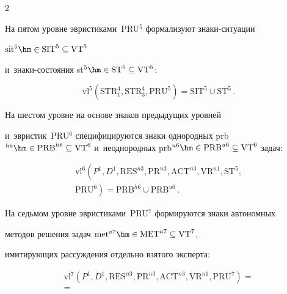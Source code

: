 \begin{multicols}{2}
  


  На пятом уровне эвристиками~PRU$^5$ формализуют зна\-ки-си\-ту\-ации 


$\mathrm{sit}^5\hm\in \mathrm{SIT}^5\subseteq \mathrm{VT}^5$ 


и~зна\-ки-со\-сто\-яния st$^5\hm\in 


\mathrm{ST}^5\subseteq \mathrm{VT}^5$:


    $$


\mathrm{vl}^5\!\left( \mathrm{STR}_1^4, \mathrm{STR}_3^4, \mathrm{PRU}^5\right) =


\mathrm{SIT}^5\cup \mathrm{ST}^5\,.


   $$


  


  На шестом уровне на основе знаков предыдущих уровней 


и~эвристик~PRU$^6$ специфицируются знаки однородных prb$^{h6} \hm\in 


\mathrm{PRB}^{h6}\subseteq \mathrm{VT}^6$ и~неоднородных prb$^{u6}\hm\in \mathrm{PRB}^{u6}\subseteq 


\mathrm{VT}^6$ задач:


   \begin{multline*}


\mathrm{vl}^6\!\left( P^1, D^1, \mathrm{RES}^{n3}, \mathrm{PR}^{n3}, 


\mathrm{ACT}^{n3}, \mathrm{VR}^{n1}, \mathrm{ST}^5,\right.\\ 


\left.\mathrm{PRU}^6\right) = \mathrm{PRB}^{h6}\cup \mathrm{PRB}^{u6}\,.


  \end{multline*}


  


  На седьмом уровне эвристиками~PRU$^7$ формируются знаки автономных 


методов решения задач $\mathrm{met}^{a7}\hm\in \mathrm{MET}^{a7}\subseteq \mathrm{VT}^7$, 


имитирующих рассуждения отдельно взятого эксперта:


  \begin{multline*}


  \mathrm{vl}^7\!\left( P^1, D^1, \mathrm{RES}^{n3}, \mathrm{PR}^{n3}, 


  \mathrm{ACT}^{n3}, \mathrm{VR}^{n1}, \mathrm{PRU}^7\right) = {}\\


  {}=



\end{multline*}
\end{multicols}
